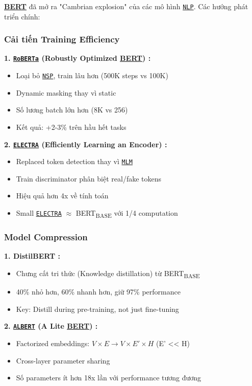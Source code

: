 \hyperref[acro:bert]{\textbf{BERT}} đã mở ra "Cambrian explosion" của các mô hình \hyperref[acro:nlp]{\texttt{NLP}}. Các hướng phát triển chính:

\subsubsection{Cải tiến Training Efficiency}

\textbf{1. \hyperref[acro:roberta]{\texttt{RoBERTa}} (Robustly Optimized \hyperref[acro:bert]{\textbf{BERT}}) \cite{liu2019roberta}:}
\begin{itemize}
    \item Loại bỏ \hyperref[acro:nsp]{\texttt{NSP}}, train lâu hơn (500K steps vs 100K)
    \item Dynamic masking thay vì static
    \item Số lương batch lớn hơn (8K vs 256)
    \item Kết quả: +2-3\% trên hầu hết tasks
\end{itemize}

\textbf{2. \hyperref[acro:electra]{\texttt{ELECTRA}} (Efficiently Learning an Encoder) \cite{clark2020electra}:}
\begin{itemize}
    \item Replaced token detection thay vì \hyperref[acro:mlm]{\texttt{MLM}}
    \item Train discriminator phân biệt real/fake tokens
    \item Hiệu quả hơn 4x về tính toán
    \item Small \hyperref[acro:electra]{\texttt{ELECTRA}} $\approx$ BERT\textsubscript{BASE} với 1/4 computation
\end{itemize}

\subsubsection{Model Compression}

\textbf{1. DistilBERT \cite{sanh2019distilbert}:}
\begin{itemize}
    \item Chưng cất tri thức (Knowledge distillation) từ BERT\textsubscript{BASE}
    \item 40\% nhỏ hơn, 60\% nhanh hơn, giữ 97\% performance
    \item Key: Distill during pre-training, not just fine-tuning
\end{itemize}

\textbf{2. \hyperref[acro:albert]{\texttt{ALBERT}} (A Lite \hyperref[acro:bert]{\textbf{BERT}}) \cite{lan2019albert}:}
\begin{itemize}
    \item Factorized embeddings: $V \times E \rightarrow V \times E' \times H$ (E' << H)
    \item Cross-layer parameter sharing
    \item Số parameters ít hơn 18x lần với performance tương đương
\end{itemize}

